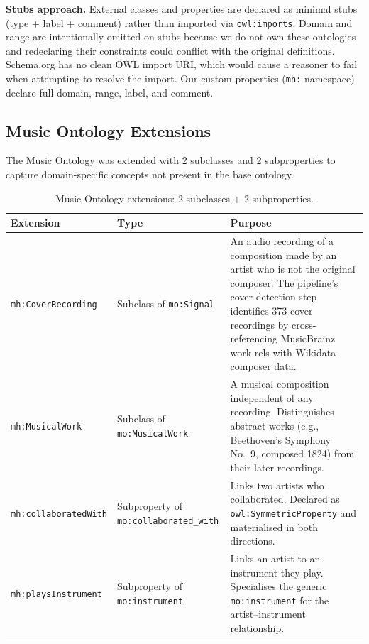 \documentclass[11pt,a4paper]{article}
\begin{document}
\textbf{Stubs approach.} External classes and properties are declared as minimal stubs (type + label + comment) rather than imported via \texttt{owl:imports}. Domain and range are intentionally omitted on stubs because we do not own these ontologies and redeclaring their constraints could conflict with the original definitions. Schema.org has no clean OWL import URI, which would cause a reasoner to fail when attempting to resolve the import. Our custom properties (\texttt{mh:} namespace) declare full domain, range, label, and comment.

\subsection{Music Ontology Extensions}

The Music Ontology was extended with 2 subclasses and 2 subproperties to capture domain-specific concepts not present in the base ontology.

\begin{table}[h]
\centering
\small
\begin{tabular}{llp{7cm}}
\toprule
\textbf{Extension} & \textbf{Type} & \textbf{Purpose} \\
\midrule
\texttt{mh:CoverRecording} & Subclass of \texttt{mo:Signal} & An audio recording of a composition made by an artist who is not the original composer. The pipeline's cover detection step identifies 373 cover recordings by cross-referencing MusicBrainz work-rels with Wikidata composer data. \\[4pt]
\texttt{mh:MusicalWork} & Subclass of \texttt{mo:MusicalWork} & A musical composition independent of any recording. Distinguishes abstract works (e.g., Beethoven's Symphony No.~9, composed 1824) from their later recordings. \\[4pt]
\texttt{mh:collaboratedWith} & Subproperty of \texttt{mo:collaborated\_with} & Links two artists who collaborated. Declared as \texttt{owl:SymmetricProperty} and materialised in both directions. \\[4pt]
\texttt{mh:playsInstrument} & Subproperty of \texttt{mo:instrument} & Links an artist to an instrument they play. Specialises the generic \texttt{mo:instrument} for the artist--instrument relationship. \\
\bottomrule
\end{tabular}
\caption{Music Ontology extensions: 2 subclasses + 2 subproperties.}
\label{tab:mo-ext}
\end{table}
\end{document}
